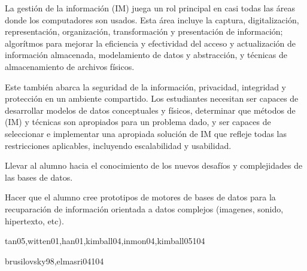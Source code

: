 \begin{syllabus}


\begin{justification}
La gestión de la información (IM) juega un rol principal en casi todas las áreas donde los computadores son usados. Esta área incluye la captura, digitalización, representación, organización, transformación y presentación de información; algorítmos para mejorar la eficiencia y efectividad del acceso y actualización de información almacenada, modelamiento de datos y abstracción, y técnicas de almacenamiento de archivos físicos.

Este también abarca la seguridad de la información, privacidad, integridad y protección en un ambiente compartido. Los estudiantes necesitan ser capaces de desarrollar modelos de datos conceptuales y físicos, determinar que métodos de (IM) y técnicas son apropiados para un problema dado, y ser capaces de seleccionar e implementar una apropiada solución de IM que refleje todas las restricciones aplicables, incluyendo escalabilidad y usabilidad.
\end{justification}

\begin{goals}
\item Llevar al alumno hacia el conocimiento de los nuevos desafíos y complejidades de las bases de datos.
\item Hacer que el alumno cree prototipos de motores de bases de datos para la recuparación de información orientada a datos complejos (imagenes, sonido, hipertexto, etc).
\end{goals}

\begin{outcomes}
\end{outcomes}

\begin{unit}{\IMDataMiningDef}{tan05,witten01,han01,kimball04,inmon04,kimball05}{10}{4}
    \IMDataMiningAllTopics%
    \IMDataMiningAllObjectives%
\end{unit}

\begin{unit}{\IMHypermidiaDef}{brusilovsky98,elmasri04}{10}{4}
    \IMHypermidiaAllTopics%
    \IMHypermidiaAllObjectives%
\end{unit}


\end{syllabus}

